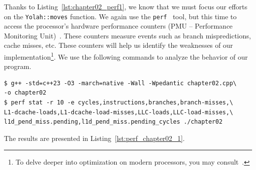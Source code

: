 \documentclass[12pt,a4paper,twoside,openright]{book}
\begin{document}

Thanks to Listing~\ref{lst:chapter02_perf1}, we know that we must focus our efforts on the \texttt{Yolah::moves} function. We again use the \texttt{perf}~\cite{perf} tool, but this time to access the processor's hardware performance counters (PMU -- Performance Monitoring Unit)~\cite{intelsdm}. These counters measure events such as branch mispredictions, cache misses, etc. These counters will help us identify the weaknesses of our implementation\footnote{To delve deeper into optimization on modern processors, you may consult~\cite{bakhvalov2024, pikus2021, algorithmica, inteltma}.}. We use the following commands to analyze the behavior of our program.

\begin{mdframed}[skipabove=\baselineskip,skipbelow=0pt,hidealllines=true,backgroundcolor=black!3,innerleftmargin=10pt,innerrightmargin=5pt,innertopmargin=0pt,innerbottommargin=5pt]
{\small
\begin{verbatim}
$ g++ -std=c++23 -O3 -march=native -Wall -Wpedantic chapter02.cpp\
-o chapter02
$ perf stat -r 10 -e cycles,instructions,branches,branch-misses,\
L1-dcache-loads,L1-dcache-load-misses,LLC-loads,LLC-load-misses,\
l1d_pend_miss.pending,l1d_pend_miss.pending_cycles ./chapter02
\end{verbatim}
}
\end{mdframed}


The results are presented in Listing~\ref{lst:perf_chapter02_1}.
\end{document}
